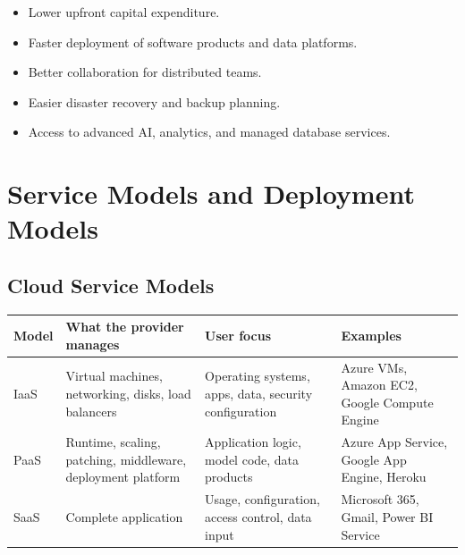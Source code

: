 \documentclass[11pt,a4paper]{article}
\begin{document}
\begin{itemize}[leftmargin=*]
  \item Lower upfront capital expenditure.
  \item Faster deployment of software products and data platforms.
  \item Better collaboration for distributed teams.
  \item Easier disaster recovery and backup planning.
  \item Access to advanced AI, analytics, and managed database services.
\end{itemize}

\section{Service Models and Deployment Models}

\subsection{Cloud Service Models}

\begin{center}
\end{center}

\begin{longtable}{p{2.7cm}p{4.2cm}p{3.6cm}p{4.0cm}}
\toprule
\textbf{Model} & \textbf{What the provider manages} & \textbf{User focus} & \textbf{Examples} \\
\midrule
IaaS & Virtual machines, networking, disks, load balancers & Operating systems, apps, data, security configuration & Azure VMs, Amazon EC2, Google Compute Engine \\
PaaS & Runtime, scaling, patching, middleware, deployment platform & Application logic, model code, data products & Azure App Service, Google App Engine, Heroku \\
SaaS & Complete application & Usage, configuration, access control, data input & Microsoft 365, Gmail, Power BI Service \\
\bottomrule
\end{longtable}
\end{document}

